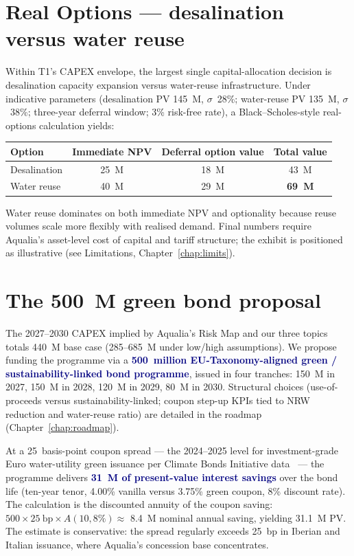 \documentclass[11pt, a4paper, twoside, openright]{scrreprt}
\newcommand{\euro}{\texteuro}
\newcommand{\signalword}[1]{\textbf{\textcolor{navy}{#1}}}
\begin{document}
\section{Real Options --- desalination versus water reuse}

Within T1's CAPEX envelope, the largest single capital-allocation decision is desalination capacity expansion versus water-reuse infrastructure. Under indicative parameters (desalination PV \euro{}145~M, $\sigma$~28\%; water-reuse PV \euro{}135~M, $\sigma$~38\%; three-year deferral window; 3\% risk-free rate), a Black--Scholes-style real-options calculation yields:

\begin{center}
\small
\begin{tabular}{lccc}
\toprule
\textbf{Option} & \textbf{Immediate NPV} & \textbf{Deferral option value} & \textbf{Total value} \\
\midrule
Desalination & \euro{}25~M & \euro{}18~M & \euro{}43~M \\
Water reuse & \euro{}40~M & \euro{}29~M & \textbf{\euro{}69~M} \\
\bottomrule
\end{tabular}
\end{center}

Water reuse dominates on both immediate NPV and optionality because reuse volumes scale more flexibly with realised demand. Final numbers require Aqualia's asset-level cost of capital and tariff structure; the exhibit is positioned as illustrative (see Limitations, Chapter~\ref{chap:limits}).

\section{The \euro{}500~M green bond proposal}

The 2027--2030 CAPEX implied by Aqualia's Risk Map and our three topics totals \euro{}440~M base case (\euro{}285--685~M under low/high assumptions). We propose funding the programme via a \signalword{\euro{}500~million EU-Taxonomy-aligned green / sustainability-linked bond programme}, issued in four tranches: \euro{}150~M in 2027, \euro{}150~M in 2028, \euro{}120~M in 2029, \euro{}80~M in 2030. Structural choices (use-of-proceeds versus sustainability-linked; coupon step-up KPIs tied to NRW reduction and water-reuse ratio) are detailed in the roadmap (Chapter~\ref{chap:roadmap}).

At a 25~basis-point coupon spread --- the 2024--2025 level for investment-grade Euro water-utility green issuance per Climate Bonds Initiative data~\cite{cbi2024} --- the programme delivers \signalword{\euro{}31~M of present-value interest savings} over the bond life (ten-year tenor, 4.00\% vanilla versus 3.75\% green coupon, 8\% discount rate). The calculation is the discounted annuity of the coupon saving: $500 \times 25~\text{bp} \times A(10, 8\%) \approx$ \euro{}8.4~M nominal annual saving, yielding \euro{}31.1~M PV. The estimate is conservative: the spread regularly exceeds 25~bp in Iberian and Italian issuance, where Aqualia's concession base concentrates.
\end{document}
